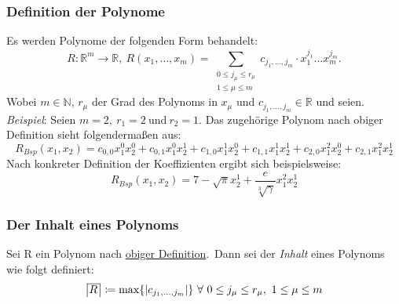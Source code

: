 \documentclass[11pt]{article}
\newcommand{\overbar}[1]{\mkern -3mu\overline{\mkern+3mu#1\mkern+4mu}\mkern -3mu}
\newcommand{\content}[1]{\left| \overbar{#1} \right|}
\begin{document}
            \subsubsection{Definition der Polynome}
            \label{subsubsec:def-poly}
                Es werden Polynome der folgenden Form behandelt:
                \begin{equation}
                    R : \mathbb{R}^m \rightarrow \mathbb{R},\
                    R(x_1, \dots, x_m) = \sum_{\substack{0 \leq j_\mu \leq r_\mu \\ 1 \leq \mu \leq m}}
                    c_{j_1, \dots, j_m} \cdot x_1^{j_1} \dots x_m^{j_m}. \label{eq:def-poly}
                \end{equation}
                Wobei $m \in \mathbb{N}$, $r_\mu$ der Grad des Polynoms in $x_\mu$ und $c_{j_1, \dots, j_m} \in
                \mathbb{R}$ und seien.
                \newline \newline
                \emph{Beispiel}: Seien $m = 2,\ r_1 = 2 \  \text{und} \  r_2 = 1$.
                \newline
                \textrm{Das zugehörige Polynom nach obiger Definition sieht folgendermaßen aus:}
                \begin{equation*}
                    R_{Bsp}(x_1, x_2) = c_{0,0} x_1^0 x_2^0 + c_{0,1} x_1^0 x_2^1 + c_{1,0} x_1^1 x_2^0 + c_{1,1} x_1^1
                    x_2^1 + c_{2, 0} x_1^2 x_2^0 + c_{2,1} x_1^2 x_2^1
                \end{equation*}
                Nach konkreter Definition der Koeffizienten ergibt sich beispielsweise:
                \begin{equation*}
                    R_{Bsp}(x_1, x_2) = 7 - \sqrt{\pi} x_2^1 + \frac{e}{\sqrt[3]{\gamma}} x_1^2 x_2^1
                \end{equation*}
            
            \subsubsection{Der Inhalt eines Polynoms}
            \label{subsubsec:content-poly}
                Sei R ein Polynom nach \hyperref[subsubsec:def-poly]{obiger Definition}.\ Dann sei der \emph{Inhalt} eines
                Polynoms wie folgt definiert:
                \begin{equation}
                     \content{R} \coloneq \max\{|c_{j_1, \dots, j_m}| \} \  \forall \  0 \leq j_\mu \leq r_\mu, \
                     1 \leq \mu \leq m \label{eq:def-content}
                \end{equation}
            
\end{document}
